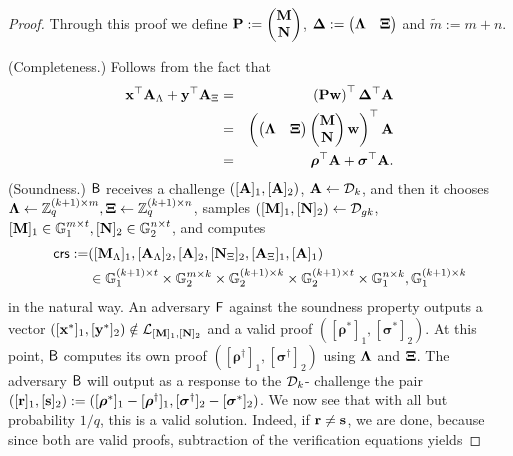 \begin{proof} Through this proof we define $\mathbf{{P}}:=\left(\begin{matrix}\mathbf{{M}}\\\mathbf{{N}}\end{matrix}\right)$, $\mathbf{{\Delta}}:=\left(\begin{matrix}\mathbf{{\Lambda}}& \mathbf{{\Xi}}\end{matrix}\right)$ and $\tilde{m}:=m+n$.

(Completeness.) Follows from the fact that
\begin{eqnarray*}
\mathbf{x}^\top\mathbf{{A}}_\Lambda+\mathbf{y}^\top\mathbf{{A}}_\Xi
& = &
\left(
\mathbf{{P}}\mathbf{w}
\right)^\top
\mathbf{{\Delta}}^\top
\mathbf{{A}}\\
& = &
\left(
\begin{pmatrix}\mathbf{{\Lambda}}&\mathbf{{\Xi}}\end{pmatrix}
\begin{pmatrix}\mathbf{{M}}\\\mathbf{{N}}\end{pmatrix}\mathbf{w}
\right)^\top
\mathbf{{A}}\\
& = &
{\boldsymbol \rho}^\top\mathbf{{A}}+{\boldsymbol \sigma}^\top\mathbf{{A}}.
\end{eqnarray*}
(Soundness.) $\mathsf{B}$ receives a challenge $([\mathbf{{A}}]_1,[\mathbf{{A}}]_2)$, $\mathbf{{A}} \gets \mathcal{D}_k$, and then it chooses $\mathbf{{\Lambda}}\gets\mathbb{Z}_q^{(k+1)\times m},\mathbf{{\Xi}}\gets\mathbb{Z}_q^{(k+1)\times n}$, samples $([\mathbf{{M}}]_1,[\mathbf{{N}}]_2) \gets \mathcal{D}_{gk}$, $[\mathbf{{M}}]_1\in\mathbb{G}_1^{m\times t},[\mathbf{{N}}]_2\in\mathbb{G}_2^{n\times t}$, and computes 
\begin{align*}
\mathsf{crs}:=&([\mathbf{{M}}_{\Lambda}]_1, [\mathbf{{A}}_\Lambda]_2 ,[\mathbf{{A}}]_2, [\mathbf{{N}}_{\Xi}]_2,[\mathbf{{A}}_{\Xi}]_1,[\mathbf{{A}}]_1)\\
&\in\mathbb{G}_1^{(k+1)\times t}\times\mathbb{G}_2^{m\times k}\times \mathbb{G}_2^{(k+1)\times k}\times \mathbb{G}_2^{(k+1)\times t}\times \mathbb{G}_1^{n\times k}, \mathbb{G}_1^{(k+1)\times k}
\end{align*}
in the natural way.
An adversary $\mathsf{F}$ against the soundness property outputs a vector $([{\mathbf{x}}^*]_1,[\mathbf{y}^*]_2) \notin \mathcal{L}_{[\mathbf{{M}}]_1,[\mathbf{{N}}]_2}$ and a valid proof
$([{\boldsymbol \rho}^{*}]_1, [{\boldsymbol \sigma}^{*}]_2)$. At this point, $\mathsf{B}$ computes its own proof $([{\boldsymbol \rho}^{\dagger}]_1, [{\boldsymbol \sigma}^{\dagger}]_2)$ using $\mathbf{{\Lambda}}$ and $\mathbf{{\Xi}}$. The adversary $\mathsf{B}$ will output as a response to the $\mathcal{D}_k$-\skermdh{} challenge the pair $([\mathbf{r}]_1,[\mathbf{s}]_2):=([{\boldsymbol \rho}^{*}]_1-[{\boldsymbol \rho}^{\dagger}]_1,[{  \boldsymbol \sigma}^{\dagger}]_2-[{\boldsymbol \sigma}^{*}]_2)$. We now see that with all but probability $1/q$, this is a valid 
solution. Indeed, if $\mathbf{r} \neq \mathbf{s}$, we are done, because since both are valid proofs, subtraction of the verification equations yields

\end{proof}
